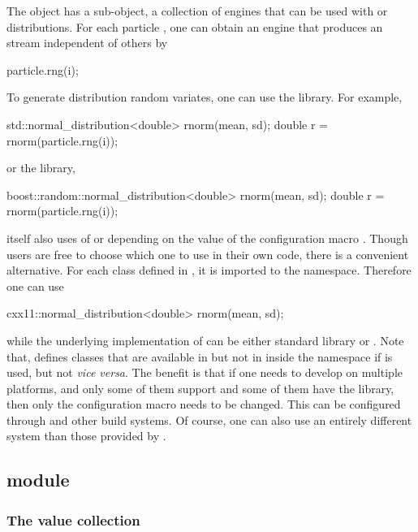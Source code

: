 \documentclass[11pt, bib, hyper, mint, minted=cache]{marticle}
\begin{document}
The  object has a sub-object, a collection of \rng
engines that can be used with \cppoo {} or \lboost
distributions. For each particle , one can obtain an engine that
produces an \rng stream independent of others by
\begin{cppcode}
particle.rng(i);
\end{cppcode}
To generate distribution random variates, one can use the
\cppoo {} library. For example,
\begin{cppcode}
std::normal_distribution<double> rnorm(mean, sd);
double r = rnorm(particle.rng(i));
\end{cppcode}
or the \lboost library,
\begin{cppcode}
boost::random::normal_distribution<double> rnorm(mean, sd);
double r = rnorm(particle.rng(i));
\end{cppcode}
\vsmc itself also uses of \cppoo {} or \lboost depending on
the value of the configuration macro .
Though users are free to choose which one to use in their own code, there is a
convenient alternative. For each class defined in \cppoo {},
it is imported to the  namespace.  Therefore one can use
\begin{cppcode}
cxx11::normal_distribution<double> rnorm(mean, sd);
\end{cppcode}
while the underlying implementation of  can be
either \cppoo standard library or \lboost. Note that, \vsmc defines classes
that are available in \cppoo {} but not in \lboost inside
the  namespace if \lboost is used, but not \emph{vice versa}.
The benefit is that if one needs to develop on multiple platforms, and only
some of them support \cppoo and some of them have the \lboost library, then
only the configuration macro  needs to be
changed. This can be configured through \lcmake and other build systems. Of
course, one can also use an entirely different \rng system than those provided
by \vsmc.

\subsection[SMP module]{\protect\smp module}
\label{sub:SMP module}

\subsubsection{The value collection}
\end{document}
